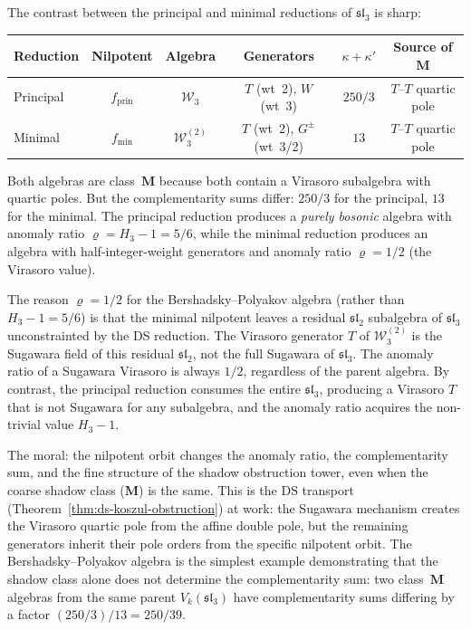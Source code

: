 \begin{remark}
\label{rem:BP-nilpotent-orbit}
The contrast between the principal and minimal reductions of
$\mathfrak{sl}_3$ is sharp:
\begin{center}
\renewcommand{\arraystretch}{1.2}
\small
\begin{tabular}{lccccc}
\textbf{Reduction} & \textbf{Nilpotent} & \textbf{Algebra}
 & \textbf{Generators} & $\kappa + \kappa'$ & \textbf{Source of $\mathbf{M}$} \\
\hline
Principal & $f_{\mathrm{prin}}$ & $\mathcal{W}_3$
 & $T$ (wt~2), $W$ (wt~3) & $250/3$ & $T$--$T$ quartic pole \\
Minimal & $f_{\min}$ & $\mathcal{W}_3^{(2)}$
 & $T$ (wt~2), $G^\pm$ (wt~3/2) & $13$ & $T$--$T$ quartic pole
\end{tabular}
\end{center}
Both algebras are class~$\mathbf{M}$ because both contain a Virasoro
subalgebra with quartic poles. But the complementarity sums differ:
$250/3$ for the principal, $13$ for the minimal. The principal
reduction produces a \emph{purely bosonic} algebra with anomaly
ratio $\varrho = H_3 - 1 = 5/6$, while the minimal reduction
produces an algebra with half-integer-weight generators and
anomaly ratio $\varrho = 1/2$ (the Virasoro value).

The reason $\varrho = 1/2$ for the Bershadsky--Polyakov algebra
(rather than $H_3 - 1 = 5/6$) is that the minimal nilpotent
leaves a residual $\mathfrak{sl}_2$ subalgebra of $\mathfrak{sl}_3$
unconstrainted by the DS reduction. The Virasoro generator $T$
of $\mathcal{W}_3^{(2)}$ is the Sugawara field of this residual
$\mathfrak{sl}_2$, not the full Sugawara of $\mathfrak{sl}_3$.
The anomaly ratio of a Sugawara Virasoro is always $1/2$, regardless
of the parent algebra. By contrast, the principal reduction
consumes the entire $\mathfrak{sl}_3$, producing a Virasoro $T$
that is not Sugawara for any subalgebra, and the anomaly ratio
acquires the non-trivial value $H_3 - 1$.

The moral: the nilpotent orbit changes the anomaly ratio, the
complementarity sum, and the fine structure of the shadow obstruction tower,
even when the coarse shadow class ($\mathbf{M}$) is the same.
This is the DS transport
(Theorem~\ref{thm:ds-koszul-obstruction}) at work: the Sugawara
mechanism creates the Virasoro quartic pole from the affine double
pole, but the remaining generators inherit their pole orders from
the specific nilpotent orbit. The Bershadsky--Polyakov algebra
is the simplest example demonstrating that the shadow class
alone does not determine the complementarity sum: two
class~$\mathbf{M}$ algebras from the same parent $V_k(\mathfrak{sl}_3)$
have complementarity sums differing by a factor
$(250/3)/13 = 250/39$.
\end{remark}


